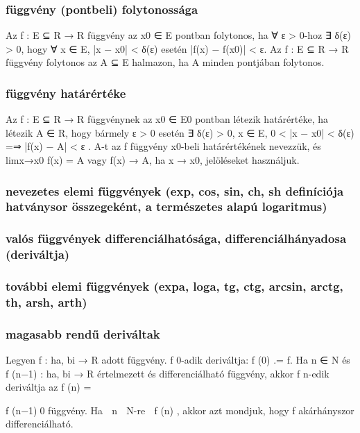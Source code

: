\documentclass[12pt]{article}
\begin{document}
\subsubsection{függvény (pontbeli) folytonossága}

Az f : E ⊆ R → R függvény az x0 ∈ E pontban folytonos,
ha ∀ ε > 0-hoz ∃ δ(ε) > 0, hogy ∀ x ∈ E, |x − x0| < δ(ε) esetén |f(x) −
f(x0)| < ε.
Az f : E ⊆ R → R függvény folytonos az A ⊆ E halmazon, ha A minden
pontjában folytonos.

\subsubsection{függvény határértéke}

Az f : E ⊆ R → R függvénynek az x0 ∈ E0 pontban létezik
határértéke, ha létezik A ∈ R, hogy bármely ε > 0 esetén ∃ δ(ε) > 0,
x ∈ E, 0 < |x − x0| < δ(ε) =⇒ |f(x) − A| < ε .
A-t az f függvény x0-beli határértékének nevezzük, és limx→x0
f(x) = A vagy
f(x) → A, ha x → x0, jelöléseket használjuk.

\subsubsection{nevezetes elemi függvények (exp, cos, sin, ch, sh
definíciója hatványsor összegeként, a természetes alapú logaritmus)}
\subsubsection{valós függvények
differenciálhatósága, differenciálhányadosa (deriváltja)}
\subsubsection{további elemi függvények
(expa, loga, tg, ctg, arcsin, arctg, th, arsh, arth)}
\subsubsection{magasabb rendű deriváltak}

Legyen f : ha, bi → R adott függvény. f 0-adik deriváltja:
f
(0) .= f. Ha n ∈ N és f
(n−1) : ha, bi → R értelmezett és differenciálható
függvény, akkor f n-edik deriváltja az f
(n) =

f
(n−1)0
függvény.
Ha ∀ n ∈ N-re ∃ f
(n)
, akkor azt mondjuk, hogy f akárhányszor differenciálható.

 
\end{document}
